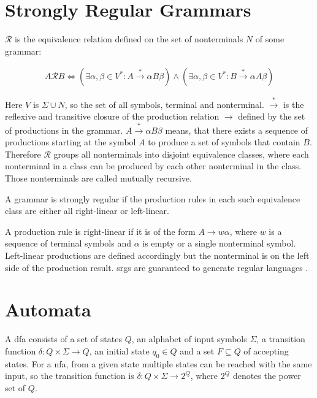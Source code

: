 \section{Strongly Regular Grammars}\label{sec:background:srg}

$\mathcal{R}$ is the equivalence relation defined on the set of nonterminals $N$ of some grammar:

\begin{align}
	A \mathcal{R} B \Leftrightarrow (\exists \alpha, \beta \in V^* : A \xrightarrow{*} \alpha B \beta) \land (\exists \alpha, \beta \in V^* : B \xrightarrow{*} \alpha A \beta) 
\end{align}

Here $V$ is $\Sigma \cup N$, so the set of all symbols, terminal and nonterminal. $\xrightarrow{*}$ is the reflexive and transitive closure of the production relation $\rightarrow$ defined by the set of productions in the grammar. $A \xrightarrow{*} \alpha B \beta$ means, that there exists a sequence of productions starting at the symbol $A$ to produce a set of symbols that contain $B$. Therefore $\mathcal{R}$ groups all nonterminals into disjoint equivalence classes, where each nonterminal in a class can be produced by each other nonterminal in the class. Those nonterminals are called mutually recursive.

A grammar is strongly regular if the production rules in each such equivalence class are either all right-linear or left-linear.

A production rule is right-linear if it is of the form $A \rightarrow w \alpha$, where $w$ is a sequence of terminal symbols and $\alpha$ is empty or a single nonterminal symbol. Left-linear productions are defined accordingly but the nonterminal is on the left side of the production result.
\Aclp{srg} are guaranteed to generate regular languages \cite{mohri_nederhof}.

\section{Automata}\label{sec:background:automata}

A \acf{dfa} consists of a set of states $Q$, an alphabet of input symbols $\Sigma$, a transition function $\delta: Q \times \Sigma \rightarrow Q$, an initial state $q_0 \in Q$ and a set $F \subseteq Q$ of accepting states.
For a \acf{nfa}, from a given state multiple states can be reached with the same input, so the transition function is  $\delta: Q \times \Sigma \rightarrow 2^Q$, where $2^Q$ denotes the power set of $Q$.

